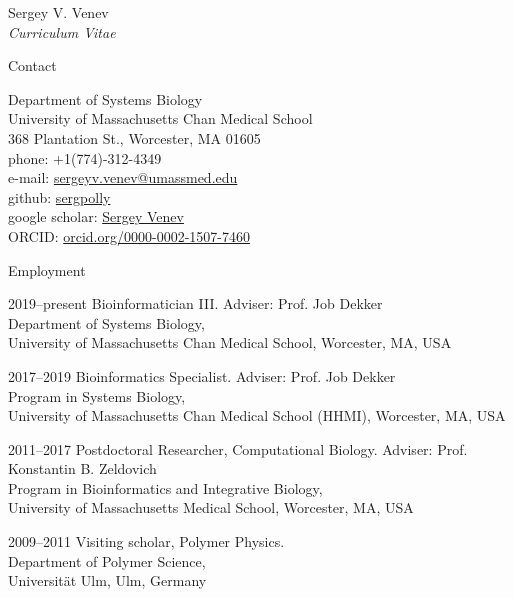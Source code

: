 \documentclass[10pt]{article}
\begin{document}




\newlength{\oldcvlabelwidth}
\renewcommand*{\cvbibname}{}

\begin{cv}{Sergey V. Venev\\{\large \itshape Curriculum Vitae}}

\begin{cvlist}{Contact}
    \item Department of Systems Biology\\
    University of Massachusetts Chan Medical School\\
    368 Plantation St., Worcester, MA 01605\\
    phone: +1(774)-312-4349\\
    e-mail: \href{mailto:sergeyv.venev@umassmed.edu}{sergeyv.venev@umassmed.edu}\\
    github: \href{https://github.com/sergpolly}{sergpolly}\\
    google scholar: \href{https://scholar.google.com/citations?user=stFuORQAAAAJ&hl=en}{Sergey Venev}\\
    ORCID: \href{https://orcid.org/0000-0002-1507-7460}{orcid.org/0000-0002-1507-7460}
\end{cvlist}

\begin{cvlist}{Employment}
    \item[2019--present] Bioinformatician III. Adviser: Prof. Job Dekker\\
    Department of Systems Biology,\\ University of Massachusetts Chan Medical School,
    Worcester, MA, USA
    \item[2017--2019] Bioinformatics Specialist. Adviser: Prof. Job Dekker\\
    Program in Systems Biology,\\ University of Massachusetts Chan Medical School (HHMI),
    Worcester, MA, USA
    \item[2011--2017] Postdoctoral Researcher, Computational Biology. Adviser: Prof. Konstantin B. Zeldovich\\
    Program in Bioinformatics and Integrative Biology,\\ University of Massachusetts Medical School,
    Worcester, MA, USA 
    \item[2009--2011] Visiting scholar, Polymer Physics. \\
    Department of Polymer Science,\\
    Universit{\"a}t Ulm, Ulm, Germany  
\end{cvlist}


\end{cv}
\end{document}
